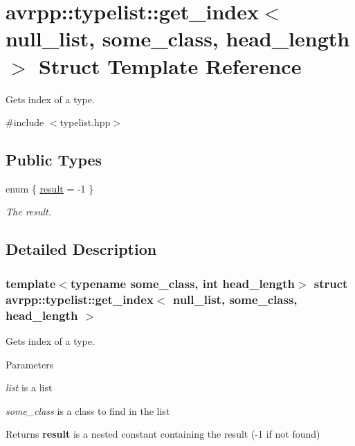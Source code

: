\hypertarget{structavrpp_1_1typelist_1_1get__index_3_01null__list_00_01some__class_00_01head__length_01_4}{
\section{avrpp::typelist::get\_\-index$<$ null\_\-list, some\_\-class, head\_\-length $>$ Struct Template Reference}
\label{structavrpp_1_1typelist_1_1get__index_3_01null__list_00_01some__class_00_01head__length_01_4}
}


Gets index of a type.  




{\ttfamily \#include $<$typelist.hpp$>$}

\subsection*{Public Types}
\begin{DoxyCompactItemize}
\item 
enum \{ \hyperlink{structavrpp_1_1typelist_1_1get__index_3_01null__list_00_01some__class_00_01head__length_01_4_a820fc2073360457cbb29ecd957245b51a2275fc664d462435f1e663681fb75ee4}{result} = -\/1
 \}
\begin{DoxyCompactList}\small\item\em The result. \item\end{DoxyCompactList}\end{DoxyCompactItemize}


\subsection{Detailed Description}
\subsubsection*{template$<$typename some\_\-class, int head\_\-length$>$ struct avrpp::typelist::get\_\-index$<$ null\_\-list, some\_\-class, head\_\-length $>$}

Gets index of a type. 
\begin{DoxyParams}{Parameters}
\item[{\em list}]is a list \item[{\em some\_\-class}]is a class to find in the list \end{DoxyParams}
\begin{DoxyReturn}{Returns}
{\bfseries result} is a nested constant containing the result (-\/1 if not found) 
\end{DoxyReturn}


